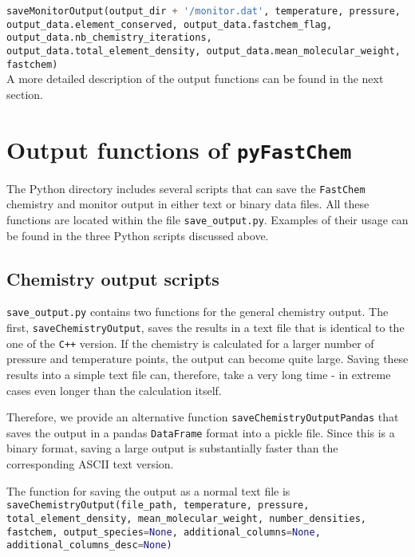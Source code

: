 \documentclass[numbers=noenddot]{aux/fcmanual}
\newcommand{\fc}{\texttt{FastChem}\xspace}
\newcommand{\pfc}{\texttt{pyFastChem}\xspace}
\newcommand{\cpp}{\ttt{C++}\xspace}
\newcommand{\ttt}[1]{\texttt {#1}}
\begin{document}
\lstinline[language=Python, breaklines, breakatwhitespace]!saveMonitorOutput(output_dir + '/monitor.dat', temperature, pressure, output_data.element_conserved, output_data.fastchem_flag, output_data.nb_chemistry_iterations, output_data.total_element_density, output_data.mean_molecular_weight, fastchem)!\\

A more detailed description of the output functions can be found in the next section.


\section{Output functions of \pfc}

The Python directory includes several scripts that can save the \fc chemistry and monitor output in either text or binary data files. All these functions are located within the file \texttt{save\_output.py}. Examples of their usage can be found in the three Python scripts discussed above. \\

\subsection{Chemistry output scripts}

\texttt{save\_output.py} contains two functions for the general chemistry output. The first, \lstinline[language=Python]!saveChemistryOutput!, saves the results in a text file that is identical to the one of the \cpp version. If the chemistry is calculated for a larger number of pressure and temperature points, the output can become quite large. Saving these results into a simple text file can, therefore, take a very long time - in extreme cases even longer than the calculation itself.

Therefore, we provide an alternative function \lstinline[language=Python]!saveChemistryOutputPandas! that saves the output in a pandas \lstinline[language=Python]!DataFrame! format into a pickle file. Since this is a binary format, saving a large output is substantially faster than the corresponding ASCII text version.

The function for saving the output as a normal text file is\\

\lstinline[language=Python, breaklines, breakatwhitespace]!saveChemistryOutput(file_path, temperature, pressure, total_element_density, mean_molecular_weight, number_densities, fastchem, output_species=None, additional_columns=None, additional_columns_desc=None)!
\end{document}
